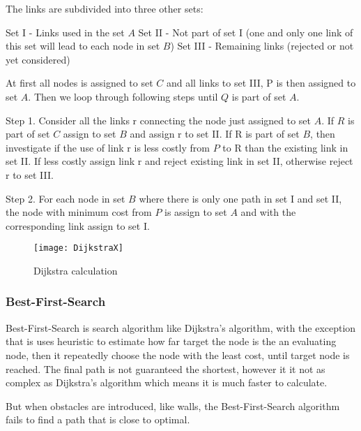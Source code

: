   The links are subdivided into three other sets:

  Set \RN{1} - Links used in the set $A$
  Set \RN{2} - Not part of set I (one and only one link of this set will lead to each node in set $B$)
  Set \RN{3} - Remaining links (rejected or not yet considered)

  At first all nodes is assigned to set $C$ and all links to set \RN{3}, P is then assigned to set $A$.
  Then we loop through following steps until $Q$ is part of set $A$.

  Step 1. Consider all the links r connecting the node just assigned to set $A$. If $R$ is part of set $C$ assign to set $B$ and assign r to set \RN{2}. 
  If R is part of set $B$, then investigate if the use of link r is less costly from $P$ to R than the existing link in set \RN{2}. If less costly assign link r and reject existing link in set \RN{2}, otherwise reject r to set \RN{3}.

  Step 2. For each node in set $B$ where there is only one path in set \RN{1} and set \RN{2}, the node with minimum cost from $P$ is assign to set $A$ and with the corresponding link assign to set \RN{1}.

  \begin{figure}[ht!]
    \centering
    \texttt{[image: DijkstraX]}
    \caption{Dijkstra calculation}
    \label{overflow}
  \end{figure}

  \subsubsection{Best-First-Search}

  Best-First-Search is search algorithm like Dijkstra's algorithm, with the exception that is uses heuristic to estimate how far target the node is the an evaluating node, then it repeatedly choose the node with the least cost, until target node is reached.  The final path is not guaranteed the shortest, however it it not as complex as Dijkstra's algorithm which means it is much faster to calculate. \cite{BestFirst}

  But when obstacles are introduced, like walls, the Best-First-Search algorithm fails to find a path that is close to optimal.

